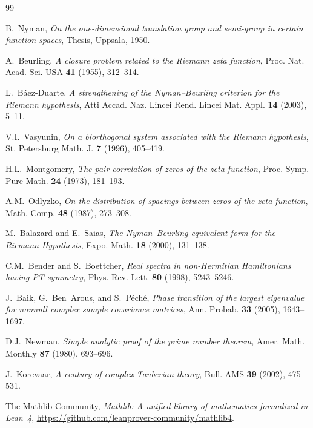 \documentclass[11pt,a4paper]{article}
\theoremstyle{definition}
\begin{document}
\begin{thebibliography}{99}

B.~Nyman, \emph{On the one-dimensional translation group and semi-group in
certain function spaces}, Thesis, Uppsala, 1950.

A.~Beurling, \emph{A closure problem related to the Riemann zeta function},
Proc. Nat. Acad. Sci. USA \textbf{41} (1955), 312--314.

L.~B\'aez-Duarte, \emph{A strengthening of the Nyman--Beurling criterion for
the Riemann hypothesis}, Atti Accad. Naz. Lincei Rend. Lincei Mat. Appl.
\textbf{14} (2003), 5--11.

V.I.~Vasyunin, \emph{On a biorthogonal system associated with the Riemann
hypothesis}, St. Petersburg Math. J. \textbf{7} (1996), 405--419.

H.L.~Montgomery, \emph{The pair correlation of zeros of the zeta function},
Proc. Symp. Pure Math. \textbf{24} (1973), 181--193.

A.M.~Odlyzko, \emph{On the distribution of spacings between zeros of the zeta
function}, Math. Comp. \textbf{48} (1987), 273--308.

M.~Balazard and E.~Saias, \emph{The Nyman--Beurling equivalent form for the
Riemann Hypothesis}, Expo. Math. \textbf{18} (2000), 131--138.

C.M.~Bender and S.~Boettcher, \emph{Real spectra in non-Hermitian
Hamiltonians having PT symmetry}, Phys. Rev. Lett. \textbf{80} (1998),
5243--5246.

J.~Baik, G.~Ben~Arous, and S.~P\'ech\'e, \emph{Phase transition of the
largest eigenvalue for nonnull complex sample covariance matrices},
Ann. Probab. \textbf{33} (2005), 1643--1697.

D.J.~Newman, \emph{Simple analytic proof of the prime number theorem},
Amer. Math. Monthly \textbf{87} (1980), 693--696.

J.~Korevaar, \emph{A century of complex Tauberian theory},
Bull. AMS \textbf{39} (2002), 475--531.

The Mathlib Community, \emph{Mathlib: A unified library of mathematics
formalized in Lean~4}, \url{https://github.com/leanprover-community/mathlib4}.

\end{thebibliography}
\end{document}

